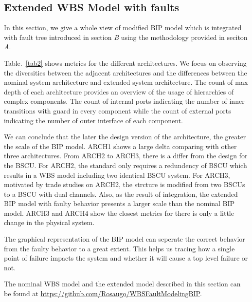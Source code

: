 \subsection{Extended WBS Model with faults}
In this section, we give a whole view of modified BIP model which is integrated with fault tree introduced in section \emph{B} using the methodology provided in seciton \emph{A}.

Table.~\ref{tab2} shows metrics for the different architectures. We focus on observing the diversities between the adjacent architectures and the differences between the nominal system architecture and extended system architecture. The count of max depth of each architecture provides an overview of the usage of hierarchies of complex components. The count of internal ports indicating the number of inner transitions with guard in every component while the count of external ports indicating the number of outer interface of each component.

We can conclude that the later the design version of the architecture, the greater the scale of the BIP model. ARCH1 shows a large delta comparing with other three architectures. From ARCH2 to ARCH3, there is a differ from the design for the BSCU. For ARCH2, the standard only requires a redundency of BSCU which results in a WBS model including two identical BSCU system. For ARCH3, motivated by trade studies on ARCH2, the strcture is modified from two BSCUs to a BSCU with dual channels. Also, as the result of integration, the extended BIP model with faulty behavior presents a larger scale than the nominal BIP model. ARCH3 and ARCH4 show the closest metrics for there is only a little change in the physical system.

The graphical representation of the BIP model can seperate the correct behavior from the faulty behavior to a great extent. This helps us tracing how a single point of failure impacts the system and whether it will cause a top level failure or not.


The nominal WBS model and the extended model described in this section can be found at \href{https://github.com/Rosaugo/WBSFaultModelingBIP}{https://github.com/Rosaugo/WBSFaultModelingBIP}. 

